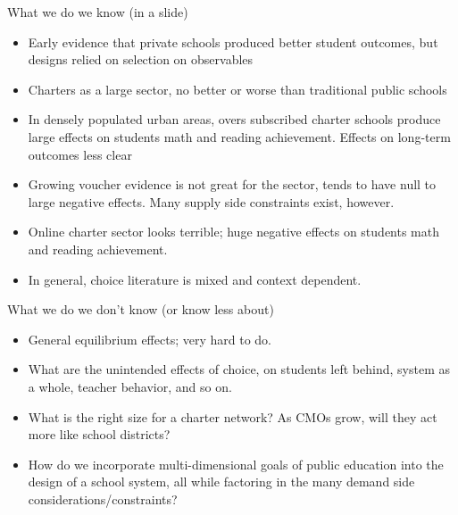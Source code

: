 \documentclass{beamer}
\begin{document}
\begin{frame}[<+->]{What we do we know (in a slide)}
	\begin{itemize}
		\item Early evidence that private schools produced better student outcomes, but designs relied on selection on observables
		\item Charters as a large sector, no better or worse than traditional public schools
		\item In densely populated urban areas, overs subscribed charter schools produce large effects on students math and reading achievement. Effects on long-term outcomes less clear
		\item Growing voucher evidence is not great for the sector, tends to have null to large negative effects. Many supply side constraints exist, however. 
		\item Online charter sector looks terrible; huge negative effects on students math and reading achievement. 
		\item In general, choice literature is mixed and context dependent.   
	\end{itemize}

\end{frame}


\begin{frame}[<+->]{What we do we don't know (or know less about)}
	\begin{itemize}
		\item General equilibrium effects; very hard to do. 
		\item What are the unintended effects of choice, on students left behind, system as a whole, teacher behavior, and so on. 
		\item What is the right size for a charter network? As CMOs grow, will they act more like school districts?
		\item How do we incorporate multi-dimensional goals of public education into the design of a school system, all while factoring in the many demand side considerations/constraints?  
	\end{itemize}

\end{frame}
\end{document}
